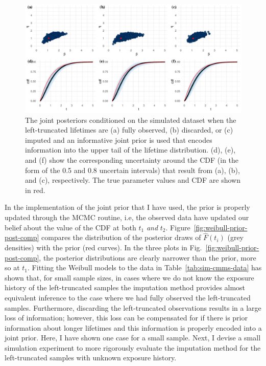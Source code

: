 \begin{figure}[t]
    \centering
    \includegraphics[width=1\textwidth]{./figures/ch-2/joint-posts-inf.pdf}
    \caption{The joint posteriors conditioned on the simulated dataset when the left-truncated lifetimes are (a) fully observed, (b) discarded, or (c) imputed and an informative joint prior is used that encodes information into the upper tail of the lifetime distribution. (d), (e), and (f) show the corresponding uncertainty around the CDF (in the form of the 0.5 and 0.8 uncertain intervals) that result from (a), (b), and (c), respectively. The true parameter values and CDF are shown in red.}
    \label{fig:joint-post-weibull-inf}
\end{figure}

In the implementation of the joint prior that I have used, the prior is properly updated through the MCMC routine, i.e, the observed data have updated our belief about the value of the CDF at both $t_1$ \emph{and} $t_2$. Figure~\ref{fig:weibull-prior-post-comp} compares the distribution of the posterior draws of $\hat{F}(t_i)$ (grey densities) with the prior (red curves). In the three plots in Fig.~\ref{fig:weibull-prior-post-comp}, the posterior distributions are clearly narrower than the prior, more so at $t_1$. Fitting the Weibull models to the data in Table~\ref{tab:sim-cmms-data} has shown that, for small sample sizes, in cases where we do not know the exposure history of the left-truncated samples the imputation method provides almost equivalent inference to the case where we had fully observed the left-truncated samples. Furthermore, discarding the left-truncated observations results in a large loss of information; however, this loss can be compensated for if there is prior information about longer lifetimes and this information is properly encoded into a joint prior. Here, I have shown one case for a small sample. Next, I devise a small simulation experiment to more rigorously evaluate the imputation method for the left-truncated samples with unknown exposure history.

